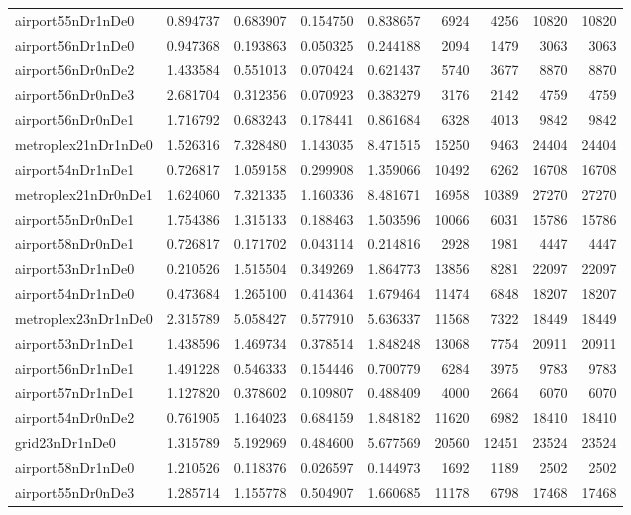 \begin{longtable}{|l|r|r|r|r|r|r|r|r|}
airport55nDr1nDe0 & 0.894737 & 0.683907 & 0.154750 & 0.838657 & 6924 & 4256 & 10820 & 10820 \\
airport56nDr1nDe0 & 0.947368 & 0.193863 & 0.050325 & 0.244188 & 2094 & 1479 & 3063 & 3063 \\
airport56nDr0nDe2 & 1.433584 & 0.551013 & 0.070424 & 0.621437 & 5740 & 3677 & 8870 & 8870 \\
airport56nDr0nDe3 & 2.681704 & 0.312356 & 0.070923 & 0.383279 & 3176 & 2142 & 4759 & 4759 \\
airport56nDr0nDe1 & 1.716792 & 0.683243 & 0.178441 & 0.861684 & 6328 & 4013 & 9842 & 9842 \\
metroplex21nDr1nDe0 & 1.526316 & 7.328480 & 1.143035 & 8.471515 & 15250 & 9463 & 24404 & 24404 \\
airport54nDr1nDe1 & 0.726817 & 1.059158 & 0.299908 & 1.359066 & 10492 & 6262 & 16708 & 16708 \\
metroplex21nDr0nDe1 & 1.624060 & 7.321335 & 1.160336 & 8.481671 & 16958 & 10389 & 27270 & 27270 \\
airport55nDr0nDe1 & 1.754386 & 1.315133 & 0.188463 & 1.503596 & 10066 & 6031 & 15786 & 15786 \\
airport58nDr0nDe1 & 0.726817 & 0.171702 & 0.043114 & 0.214816 & 2928 & 1981 & 4447 & 4447 \\
airport53nDr1nDe0 & 0.210526 & 1.515504 & 0.349269 & 1.864773 & 13856 & 8281 & 22097 & 22097 \\
airport54nDr1nDe0 & 0.473684 & 1.265100 & 0.414364 & 1.679464 & 11474 & 6848 & 18207 & 18207 \\
metroplex23nDr1nDe0 & 2.315789 & 5.058427 & 0.577910 & 5.636337 & 11568 & 7322 & 18449 & 18449 \\
airport53nDr1nDe1 & 1.438596 & 1.469734 & 0.378514 & 1.848248 & 13068 & 7754 & 20911 & 20911 \\
airport56nDr1nDe1 & 1.491228 & 0.546333 & 0.154446 & 0.700779 & 6284 & 3975 & 9783 & 9783 \\
airport57nDr1nDe1 & 1.127820 & 0.378602 & 0.109807 & 0.488409 & 4000 & 2664 & 6070 & 6070 \\
airport54nDr0nDe2 & 0.761905 & 1.164023 & 0.684159 & 1.848182 & 11620 & 6982 & 18410 & 18410 \\
grid23nDr1nDe0 & 1.315789 & 5.192969 & 0.484600 & 5.677569 & 20560 & 12451 & 23524 & 23524 \\
airport58nDr1nDe0 & 1.210526 & 0.118376 & 0.026597 & 0.144973 & 1692 & 1189 & 2502 & 2502 \\
airport55nDr0nDe3 & 1.285714 & 1.155778 & 0.504907 & 1.660685 & 11178 & 6798 & 17468 & 17468 \\

\end{longtable}
